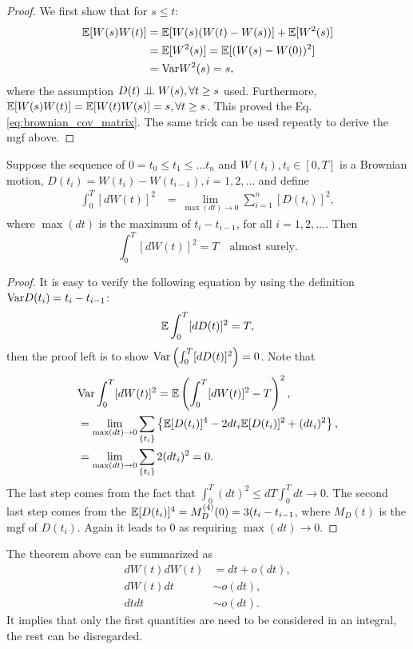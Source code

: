 \begin{proof}
We first show that for $s\le t$:
\begin{equation}
\begin{aligned}
\mathbb{E}[W(s)W(t)]&=\mathbb{E}[W(s)(W(t)-W(s))]+\mathbb{E}[W^2(s)]\\
&=\mathbb{E}[W^2(s)]=\mathbb{E}[(W(s)-W(0))^2]\\
&=\text{Var} W^2(s)=s,
\end{aligned}
\end{equation}
where the assumption $D(t)\perp\!\!\!\perp W(s),\forall t\ge s$ used. Furthermore, $\mathbb{E}[W(s)W(t)]=\mathbb{E}[W(t)W(s)]=s,\forall t\ge s$. This proved the Eq.\ref{eq:brownian_cov_matrix}. The same trick can be used repeatly to derive the mgf above.
\end{proof}

\begin{theorem}
Suppose the sequence of $0=t_0\le t_1\le\dots t_n$ and $W(t_i),t_i\in [0,T]$ is a Brownian motion, $D(t_i)=W(t_i)-W(t_{i-1}),i=1,2,\dots$ and define
\begin{equation}
\begin{aligned}
\int_0^T[dW(t)]^2&=\lim_{\max(dt)\to 0}\sum_{i=1}^n[D(t_i)]^2,
\end{aligned}
\end{equation}
where $\max(dt)$ is the maximum of $t_i-t_{i-1}$, for all $i=1,2,\dots$. Then
\begin{equation}
\int_0^T[dW(t)]^2 = T \quad\text{almost surely.}
\end{equation}
\end{theorem}

\begin{proof}
It is easy to verify the following equation by using the definition $\text{Var} D(t_i)=t_i-t_{i-1}$:
\begin{equation}
\mathbb{E} \int_0^T[dD(t)]^2=T,
\end{equation}
then the proof left is to show $\text{Var}\left(\int_0^T[dD(t)]^2\right)=0$. Note that
\begin{equation*}
\begin{aligned}
&\text{Var}\int_0^T[dW(t)]^2=\mathbb{E}\left(\int_0^T[dW(t)]^2-T\right)^2,\\
&=\lim_{\max(dt)\to0} \sum_{\{t_i\}}\left\{\mathbb{E} [D(t_i)]^4-2dt_i\mathbb{E} [D(t_i)]^2+(dt_i)^2\right\},\\
&=\lim_{\max(dt)\to0} \sum_{\{t_i\}}2(dt_i)^2=0.
\end{aligned}
\end{equation*}
The last step comes from the fact that $\int_0^T (dt)^2\le dT\int_0^T dt\to0$. The second last step comes from the $\mathbb{E} [D(t_i)]^4=M_D^{(4)}(0)=3(t_i-t_{i-1}$, where $M_D(t)$ is the mgf of $D(t_i)$. Again it leads to 0 as requiring $\max(dt)\to0$.
\end{proof}

The theorem above can be summarized as
\begin{equation}
\begin{aligned}
dW(t)dW(t)&=dt+o(dt),\\
dW(t)dt&\sim o(dt),\\
dtdt&\sim o(dt).
\end{aligned}
\end{equation}
It implies that only the first quantities are need to be considered in an integral, the rest can be disregarded.
